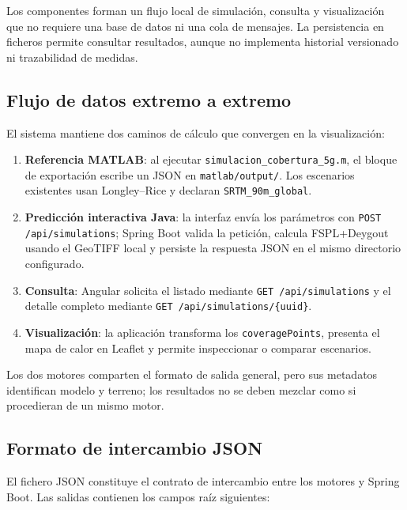 Los componentes forman un flujo local de simulación, consulta y visualización que no
requiere una base de datos ni una cola de mensajes. La persistencia en ficheros permite
consultar resultados, aunque no implementa historial versionado ni trazabilidad de medidas.

\subsection{Flujo de datos extremo a extremo}
\label{sec:integracion_flujo}

El sistema mantiene dos caminos de cálculo que convergen en la visualización:

\begin{enumerate}
\item \textbf{Referencia MATLAB}: al ejecutar \texttt{simulacion\_cobertura\_5g.m},
  el bloque de exportación escribe un JSON en \texttt{matlab/output/}. Los escenarios
  existentes usan Longley--Rice y declaran \texttt{SRTM\_90m\_global}.
\item \textbf{Predicción interactiva Java}: la interfaz envía los parámetros con
  \texttt{POST /api/simulations}; Spring Boot valida la petición, calcula FSPL+Deygout
  usando el GeoTIFF local y persiste la respuesta JSON en el mismo directorio configurado.
\item \textbf{Consulta}: Angular solicita el listado mediante
  \texttt{GET /api/simulations} y el detalle completo mediante
  \texttt{GET /api/simulations/\{uuid\}}.
\item \textbf{Visualización}: la aplicación transforma los \texttt{coveragePoints},
  presenta el mapa de calor en Leaflet y permite inspeccionar o comparar escenarios.
\end{enumerate}

Los dos motores comparten el formato de salida general, pero sus metadatos identifican
modelo y terreno; los resultados no se deben mezclar como si procedieran de un mismo motor.

\subsection{Formato de intercambio JSON}
\label{sec:integracion_json}

El fichero JSON constituye el contrato de intercambio entre los motores y Spring Boot.
Las salidas contienen los campos raíz siguientes:

